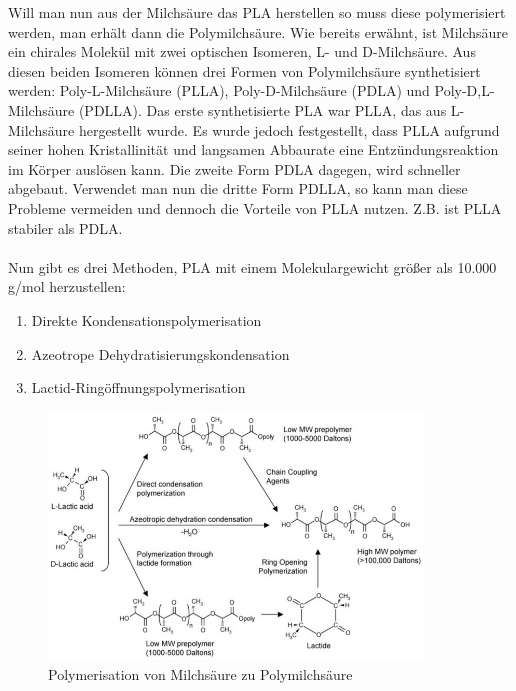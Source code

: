 \documentclass[10pt]{article}
\begin{document}
    Will man nun aus der Milchsäure das PLA herstellen so muss diese polymerisiert werden, man erhält dann die Polymilchsäure.
    Wie bereits erwähnt, ist Milchsäure ein chirales Molekül mit zwei optischen Isomeren, L- und D-Milchsäure.
    Aus diesen beiden Isomeren können drei Formen von Polymilchsäure synthetisiert werden: Poly-L-Milchsäure (PLLA), Poly-D-Milchsäure (PDLA) und Poly-D,L-Milchsäure (PDLLA).
    Das erste synthetisierte PLA war PLLA, das aus L-Milchsäure hergestellt wurde.
    Es wurde jedoch festgestellt, dass PLLA aufgrund seiner hohen Kristallinität und langsamen Abbaurate eine Entzündungsreaktion im Körper auslösen kann.
    Die zweite Form PDLA dagegen, wird schneller abgebaut.
    Verwendet man nun die dritte Form PDLLA, so kann man diese Probleme vermeiden und dennoch die Vorteile von PLLA nutzen.
    Z.B. ist PLLA stabiler als PDLA. \\ \\
    Nun gibt es drei Methoden, PLA mit einem Molekulargewicht größer als 10.000 g/mol herzustellen:
    \begin{enumerate}
        \item Direkte Kondensationspolymerisation
        \item Azeotrope Dehydratisierungskondensation
        \item Lactid-Ringöffnungspolymerisation
    \end{enumerate}

    \begin{figure}[H]
        \centering
        \includegraphics[width=10cm]{img/PLA_synthese}
        \caption*{Polymerisation von Milchsäure zu Polymilchsäure}
    \end{figure}
\end{document}
